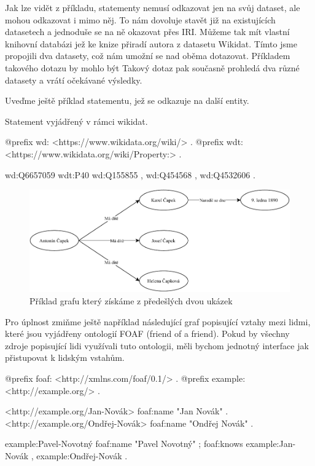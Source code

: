 Jak lze vidět z příkladu, statementy nemusí odkazovat jen na svůj dataset, ale mohou odkazovat i mimo něj. To nám dovoluje stavět již na existujících datasetech a jednoduše se na ně okazovat přes IRI. Můžeme tak mít vlastní knihovní databázi jež ke knize přiradí autora z datasetu Wikidat. Tímto jsme propojili dva datasety, což nám umožní se nad oběma dotazovat. Příkladem takového dotazu by mohlo být  Takový dotaz pak současně prohledá dva různé datasety a vrátí očekávané výsledky.

Uveďme ještě příklad statementu, jež se odkazuje na další entity.
\begin{prikl}
Statement  vyjádřený v rámci wikidat.
\begin{code}
@prefix wd: <https://www.wikidata.org/wiki/> .
@prefix wdt: <https://www.wikidata.org/wiki/Property:> .

wd:Q6657059 wdt:P40 wd:Q155855 ,
                    wd:Q454568 ,
                    wd:Q4532606 .
\end{code}
\end{prikl}

\begin{figure}[h]
    \centering
    \includegraphics[width=\textwidth]{media/rdf.pdf}
    \caption{Příklad grafu který získáme z předešlých dvou ukázek}
\end{figure}

Pro úplnost zmiňme ještě například následující graf popisující vztahy mezi lidmi, které jsou vyjádřeny ontologií FOAF (friend of a friend). Pokud by všechny zdroje popisující lidi využívali tuto ontologii, měli bychom jednotný interface jak přistupovat k lidským vstahům.

\begin{code}
@prefix foaf: <http://xmlns.com/foaf/0.1/> .
@prefix example: <http://example.org/> .

<http://example.org/Jan-Novák> foaf:name "Jan Novák" .
<http://example.org/Ondřej-Novák> foaf:name "Ondřej Novák" .

example:Pavel-Novotný foaf:name "Pavel Novotný" ;
                      foaf:knows example:Jan-Novák ,
                                 example:Ondřej-Novák .
\end{code}
